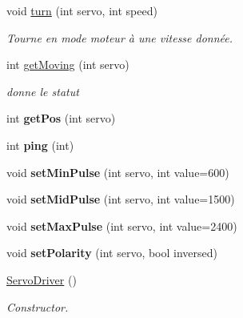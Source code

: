\begin{DoxyCompactItemize}
\mbox{\label{classServoDriver_ad68ebde8a710451c8fea2cd03cfa4bc0}} 
void \hyperlink{classServoDriver_ad68ebde8a710451c8fea2cd03cfa4bc0}{turn} (int servo, int speed)
\begin{DoxyCompactList}\small\item\em Tourne en mode moteur à une vitesse donnée. \end{DoxyCompactList}\item 
int \hyperlink{classServoDriver_a0a8e84f0bbcff39549ddfc239f1a6237}{get\+Moving} (int servo)
\begin{DoxyCompactList}\small\item\em donne le statut \end{DoxyCompactList}\item 
\mbox{\label{classServoDriver_a53c3d2e48084d579a2a570b97220c835}} 
int {\bfseries get\+Pos} (int servo)
\item 
\mbox{\label{classServoDriver_afc853f7f2f46acb7e4721f4ce4314522}} 
int {\bfseries ping} (int)
\item 
\mbox{\label{classServoDriver_a40ec259cb0ced3154b1e73cc52d48938}} 
void {\bfseries set\+Min\+Pulse} (int servo, int value=600)
\item 
\mbox{\label{classServoDriver_a92d53f7f50a7eb95e14ae358ad0b7d23}} 
void {\bfseries set\+Mid\+Pulse} (int servo, int value=1500)
\item 
\mbox{\label{classServoDriver_aaaeaab97cef5c2ebcd05c265fdff747f}} 
void {\bfseries set\+Max\+Pulse} (int servo, int value=2400)
\item 
\mbox{\label{classServoDriver_a89b2add38109f20260369e0a0d747bf2}} 
void {\bfseries set\+Polarity} (int servo, bool inversed)
\item 
\mbox{\label{classServoDriver_a2076bae148e26ee3f854f1f1984d9714}} 
\hyperlink{classServoDriver_a2076bae148e26ee3f854f1f1984d9714}{Servo\+Driver} ()
\begin{DoxyCompactList}\small\item\em Constructor. \end{DoxyCompactList}\item 

\end{DoxyCompactItemize}
